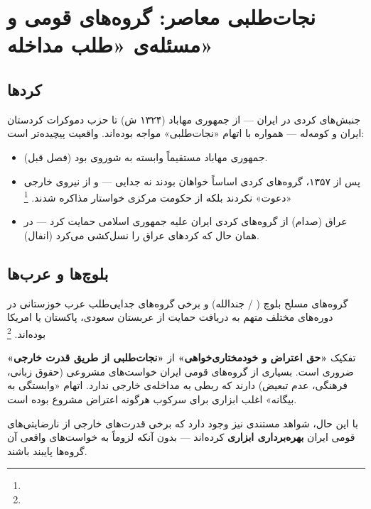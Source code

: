 \section{نجات‌طلبی معاصر: گروه‌های قومی و مسئله‌ی «طلب مداخله»}
\label{sec:ch07-ethnic-salvation}

\subsection{کردها}
\label{subsec:ch07-kurds}

جنبش‌های کردی در ایران — از جمهوری مهاباد (۱۳۲۴ ش) تا حزب دموکرات کردستان ایران و کومه‌له — همواره با اتهام «نجات‌طلبی» مواجه بوده‌اند. واقعیت پیچیده‌تر است:

\begin{itemize}[nosep, rightmargin=1em]
  \item جمهوری مهاباد مستقیماً وابسته به شوروی بود (فصل قبل).
  \item پس از ۱۳۵۷، گروه‌های کردی اساساً خواهان  بودند نه جدایی — و از نیروی خارجی «دعوت» نکردند بلکه از حکومت مرکزی خواستار مذاکره شدند.%
  \footnote{}
  \item عراق (صدام) از گروه‌های کردی ایران علیه جمهوری اسلامی حمایت کرد — در همان حال که کردهای عراق را نسل‌کشی می‌کرد (انفال).
\end{itemize}

\subsection{بلوچ‌ها و عرب‌ها}
\label{subsec:ch07-baluch-arab}

گروه‌های مسلح بلوچ ( / جندالله) و برخی گروه‌های جدایی‌طلب عرب خوزستانی در دوره‌های مختلف متهم به دریافت حمایت از عربستان سعودی، پاکستان یا امریکا بوده‌اند.%
\footnote{}

\begin{tcolorbox}[enemybox, title={نکته‌ی اخلاقی-تحلیلی}]
تفکیک \textbf{«حق اعتراض و خودمختاری‌خواهی»} از \textbf{«نجات‌طلبی از طریق قدرت خارجی»} ضروری است. بسیاری از گروه‌های قومی ایران خواست‌های مشروعی (حقوق زبانی، فرهنگی، عدم تبعیض) دارند که ربطی به مداخله‌ی خارجی ندارد. اتهام «وابستگی به بیگانه» اغلب ابزاری برای سرکوب هرگونه اعتراض مشروع بوده است.

با این حال، شواهد مستندی نیز وجود دارد که برخی قدرت‌های خارجی از نارضایتی‌های قومی ایران \textbf{بهره‌برداری ابزاری} کرده‌اند — بدون آنکه لزوماً به خواست‌های واقعی آن گروه‌ها پایبند باشند.
\end{tcolorbox}

